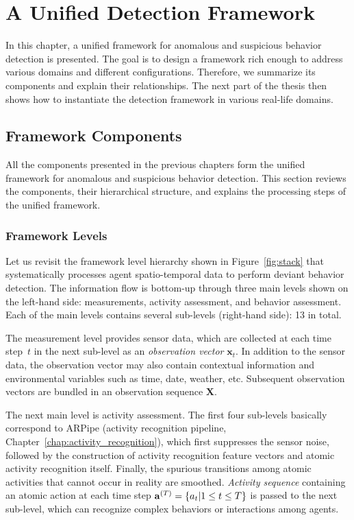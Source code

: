 
%
%
\chapter{A Unified Detection Framework}
\label{chap:framework}

In this chapter, a unified framework for anomalous and suspicious behavior detection is presented. The goal is to design a framework rich enough to address various domains and different configurations. Therefore, we summarize its components and explain their relationships. The next part of the thesis then shows how to instantiate the detection framework in various real-life domains.

\section{Framework Components}

All the components presented in the previous chapters form the unified framework for anomalous and suspicious behavior detection. This section reviews the components, their hierarchical structure, and explains the processing steps of the unified framework.

\subsection{Framework Levels}

Let us revisit the framework level hierarchy shown in Figure~\ref{fig:stack} that systematically processes agent spatio-temporal data to perform deviant behavior detection. The information flow is bottom-up through three main levels shown on the left-hand side: measurements, activity assessment, and behavior assessment. Each of the main levels contains several sub-levels (right-hand side): 13 in total. 

The measurement level provides sensor data, which are collected at each time step~$t$ in the next sub-level as an \emph{observation vector} $\mathbf{x}_t$. In addition to the sensor data, the observation vector may also contain contextual information and environmental variables such as time, date, weather, etc. Subsequent observation vectors are bundled in an observation sequence $\mathbf{X}$.

The next main level is activity assessment. The first four sub-levels basically correspond to ARPipe (activity recognition pipeline, Chapter~\ref{chap:activity_recognition}), which first suppresses the sensor noise, followed by the construction of activity recognition feature vectors and atomic activity recognition itself. Finally, the spurious transitions among atomic activities that cannot occur in reality are smoothed. \emph{Activity sequence} containing an atomic action at each time step $\mathbf{a}^{\scriptsize(T)}=\{a_t|1 \leq t \leq T\}$ is passed to the next sub-level, which can recognize complex behaviors or interactions among agents.


